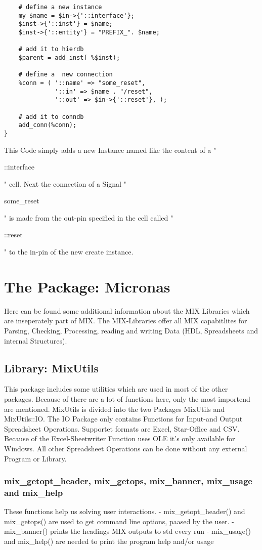 \documentclass[a4paper,12pt]{article}
\begin{document}
\begin{tt}
\begin{verbatim}
    # define a new instance
    my $name = $in->{'::interface'};
    $inst->{'::inst'} = $name;
    $inst->{'::entity'} = "PREFIX_". $name;

    # add it to hierdb
    $parent = add_inst( %$inst);

    # define a  new connection
    %conn = ( '::name' => "some_reset",
              '::in' => $name . "/reset",
              '::out' => $in->{'::reset'}, );

    # add it to conndb
    add_conn(%conn);
}
\end{verbatim}
This Code simply adds a new Instance named like the content of a "\begin{tt}::interface\end{tt}" cell. Next the connection of a Signal "\begin{tt}some_reset\end{tt}" is made from the out-pin specified in the cell called "\begin{tt}::reset\end{tt}" to the in-pin of the new create instance.



\section{The Package: Micronas}
Here can be found some additional information about the MIX Libraries which are inseperately part of MIX. The MIX-Libraries offer all MIX capabitlites for Parsing, Checking, Processing, reading and writing Data (HDL, Spreadsheets and internal Structures).


\subsection{Library: MixUtils}
This package includes some utilities which are used in most of the other packages. Because of there are a lot of functions here, only the most importend are mentioned. MixUtils is divided into the two Packages MixUtils and MixUtils::IO. The IO Package only contains Functions for Input-and Output Spreadsheet Operations. Supportet formats are Excel, Star-Office and CSV. Because of the Excel-Sheetwriter Function uses OLE it's only available for Windows. All other Spreadsheet Operations can be done without any external Program or Library.


\subsubsection{mix\_getopt\_header, mix\_getops, mix\_banner, mix\_usage and mix\_help}
These functions help us solving user interactions.\newline
\hspace*{10mm}- mix\_getopt\_header() and mix\_getops() are used to get command line options, paased by the user.
\hspace*{10mm}- mix\_banner() prints the headings MIX outputs to std every run
\hspace*{10mm}- mix\_usage() and mix\_help() are needed to print the program help and/or usage



\end{tt}
\end{document}
